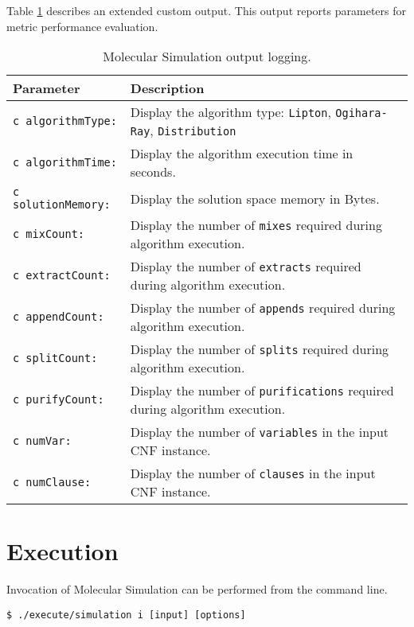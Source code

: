 Table \ref{outputTableDefiniton} describes an extended custom output.  This output reports parameters for metric performance evaluation.
\begin{table}[htdp]
\caption{Molecular Simulation output logging.}
\begin{center}
\begin{tabular}{| l | l |}
\hline
\textbf{Parameter} & \textbf{Description} \\ \hline	
\texttt{c algorithmType:}&	Display the algorithm type: \texttt{Lipton}, \texttt{Ogihara-Ray}, \texttt{Distribution}\\ 
\texttt{c algorithmTime:}&	Display the algorithm execution time in seconds.\\ 
\texttt{c solutionMemory:}& Display the solution space memory in Bytes.	\\ 
\texttt{c mixCount:}	&	Display the number of \texttt{mixes} required during algorithm execution.\\ 
\texttt{c extractCount:}&	Display the number of \texttt{extracts} required during algorithm execution.\\ 
\texttt{c appendCount:}&	Display the number of \texttt{appends} required during algorithm execution.\\ 
\texttt{c splitCount:}	&	Display the number of \texttt{splits} required during algorithm execution.\\ 
\texttt{c purifyCount:}&	Display the number of \texttt{purifications} required during algorithm execution.\\ 
\texttt{c numVar:}	&	Display the number of \texttt{variables} in the input CNF instance.\\ 
\texttt{c numClause:}	&	Display the number of \texttt{clauses} in the input CNF instance.\\ \hline

\end{tabular}
\end{center}
\label{outputTableDefiniton}
\end{table}%
		
\FloatBarrier
			
\section{Execution}
Invocation of Molecular Simulation can be performed from the command line.
	\begin{center}
	\texttt{\$ ./execute/simulation i [input] [options]}
	\end{center}

